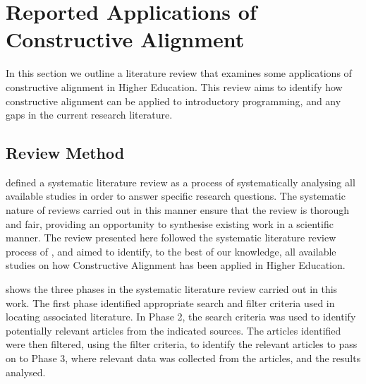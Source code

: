 

\clearpage
\section{Reported Applications of Constructive Alignment} %
\label{sec:reported_applications_of_constructive_alignment}

In this section we outline a literature review that examines some applications of constructive alignment in Higher Education. This review aims to identify how constructive alignment can be applied to introductory programming, and any gaps in the current research literature. 

\subsection{Review Method} %
\label{sub:review_method}

\citet{Petticrew:2008} defined a systematic literature review as a process of systematically analysing all available studies in order to answer specific research questions. The systematic nature of reviews carried out in this manner ensure that the review is thorough and fair, providing an opportunity to synthesise existing work in a scientific manner. The review presented here followed the systematic literature review process of \citet{Kitchenham:2004}, and aimed to identify, to the best of our knowledge, all available studies on how Constructive Alignment has been applied in Higher Education.

 shows the three phases in the systematic literature review carried out in this work. The first phase identified appropriate search and filter criteria used in locating associated literature. In Phase 2, the search criteria was used to identify potentially relevant articles from the indicated sources. The articles identified were then filtered, using the filter criteria, to identify the relevant articles to pass on to Phase 3, where relevant data was collected from the articles, and the results analysed.

